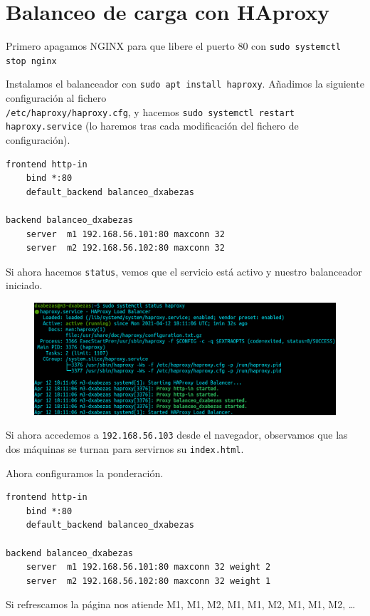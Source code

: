 \documentclass{article}
\begin{document}
\section{Balanceo de carga con HAproxy}

Primero apagamos NGINX para que libere el puerto 80 con \verb^sudo systemctl stop nginx^

Instalamos el balanceador con \verb^sudo apt install haproxy^. Añadimos la siguiente configuración al fichero \\
\texttt{/etc/haproxy/haproxy.cfg}, y hacemos \verb^sudo systemctl restart haproxy.service^ (lo haremos tras cada
modificación del fichero de configuración).

\begin{Verbatim}[tabsize=4]
frontend http-in
	bind *:80
	default_backend balanceo_dxabezas

backend balanceo_dxabezas
	server  m1 192.168.56.101:80 maxconn 32
	server  m2 192.168.56.102:80 maxconn 32
\end{Verbatim}

Si ahora hacemos \texttt{status}, vemos que el servicio está activo y nuestro balanceador iniciado.

\begin{figure}[H]
	\centering
	\includegraphics[width=160mm]{imgs/haproxy-status}
	\label{fig:haproxy-status}
\end{figure}

Si ahora accedemos a \texttt{192.168.56.103} desde el navegador, observamos que las dos máquinas se turnan para
servirnos su \texttt{index.html}.

Ahora configuramos la ponderación.

\begin{Verbatim}[tabsize=4]
frontend http-in
	bind *:80
	default_backend balanceo_dxabezas

backend balanceo_dxabezas
	server  m1 192.168.56.101:80 maxconn 32 weight 2
	server  m2 192.168.56.102:80 maxconn 32 weight 1
\end{Verbatim}
Si refrescamos la página nos atiende M1, M1, M2, M1, M1, M2, M1, M1, M2, \ldots
\end{document}
